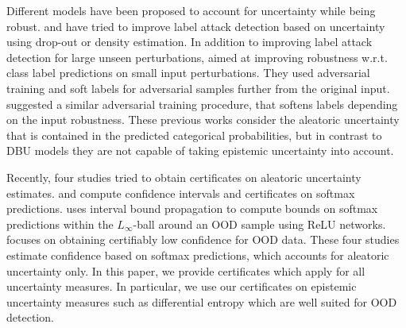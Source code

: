 Different models have been proposed to account for uncertainty while being robust.  \citep{smith2018} and \citep{simple_ood_adv_detection} have tried to improve label attack detection based on uncertainty using drop-out or density estimation. In addition to improving label attack detection for large unseen perturbations, \citep{stutz2020} aimed at improving robustness w.r.t. class label predictions on small input perturbations. They used adversarial training and soft labels for adversarial samples further from the original input. \citep{qin2020} suggested a similar adversarial training procedure, that softens labels depending on the input robustness. These previous works consider the aleatoric uncertainty that is contained in the predicted categorical probabilities, but in contrast to DBU models they are not capable of taking epistemic uncertainty into account. 



Recently, four studies tried to obtain certificates on aleatoric uncertainty estimates. \citep{single_model_quantile} and \citep{confidence_certificate_rs} compute confidence intervals and certificates on softmax predictions. \citep{bitterwolf2020} uses interval bound propagation to compute bounds on softmax predictions within the $L_{\infty}$-ball around an OOD sample using ReLU networks. \citep{provable-uncertainty} focuses on obtaining certifiably low confidence for OOD data. These four studies estimate confidence based on softmax predictions, which accounts for aleatoric uncertainty only. In this paper, we provide certificates which apply for all uncertainty measures. In particular, we use our certificates on epistemic uncertainty measures such as differential entropy which are well suited for OOD detection.



